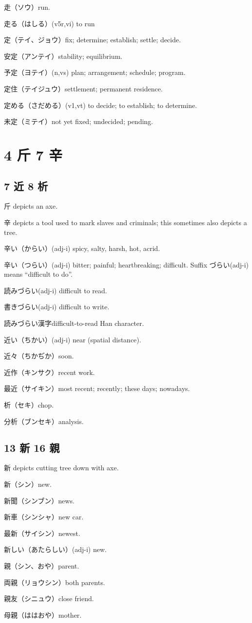 走（ソウ）run.

走る（はしる）(v5r,vi) to run

定（テイ、ジョウ）fix; determine; establish; settle; decide.

安定（アンテイ）stability; equilibrium.

予定（ヨテイ）(n,vs) plan; arrangement; schedule; program.

定住（テイジュウ）settlement; permanent residence.

定める（さだめる）(v1,vt) to decide; to establish; to determine.

未定（ミテイ）not yet fixed; undecided; pending.

\section{4 斤 7 辛}

\subsection{7 近 8 析}

斤 depicts an axe.

辛 depicts a tool used to mark slaves and criminals;
this sometimes also depicts a tree.

辛い（からい）(adj-i) spicy, salty, harsh, hot, acrid.

辛い（つらい）(adj-i) bitter; painful; heartbreaking; difficult.
Suffix づらい(adj-i) means ``difficult to do''.

読みづらい(adj-i) difficult to read.

書きづらい(adj-i) difficult to write.

読みづらい漢字difficult-to-read Han character.

近い（ちかい）(adj-i) near (spatial distance).

近々（ちかぢか）soon.

近作（キンサク）recent work.

最近（サイキン）most recent; recently; these days; nowadays.

析（セキ）chop.

分析（ブンセキ）analysis.

\subsection{13 新 16 親}

新 depicts cutting tree down with axe.

新（シン）new.

新聞（シンブン）news.

新車（シンシャ）new car.

最新（サイシン）newest.

新しい（あたらしい）(adj-i) new.

親（シン、おや）parent.

両親（リョウシン）both parents.

親友（シニュウ）close friend.

母親（ははおや）mother.
